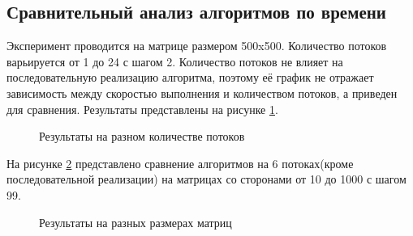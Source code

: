\documentclass{article}
\begin{document}
	\subsection{Сравнительный анализ алгоритмов по времени}
	Эксперимент проводится на матрице размером 500x500. Количество потоков варьируется от 1 до 24 с шагом 2. Количество потоков не влияет на последовательную реализацию алгоритма, поэтому её график не отражает зависимость между скоростью выполнения и количеством потоков, а приведен для сравнения.  Результаты представлены на рисунке \hyperref[test_mylt]{\ref{test_mylt}}.
	\begin{figure}[h!]
		 	\caption{Результаты на разном количестве потоков}
		 	\label{test_mylt}
	 	\end{figure}
	\newpage
	На рисунке \hyperref[test_fix]{\ref{test_fix}} представлено сравнение алгоритмов на 6 потоках(кроме последовательной реализации) на матрицах со сторонами от 10 до 1000 с шагом 99.
	\begin{figure}[h!]
		 	\caption{Результаты на разных размерах матриц}
		 	\label{test_fix}
	 	\end{figure}
	\newpage
\end{document}
